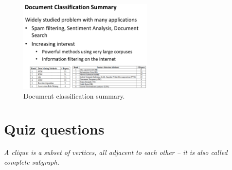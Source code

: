 \begin{figure}[htp]
  \centering
    \includegraphics[width=0.6\textwidth]{images/dcsum.png}
    \caption{Document classification summary.}
    \label{fig:dcsum}
\end{figure}



\section*{Quiz questions} %
\label{sec:quiz_questions}

\emph{A clique is a subset of vertices, all adjacent to each other -- it is also called complete subgraph.}

